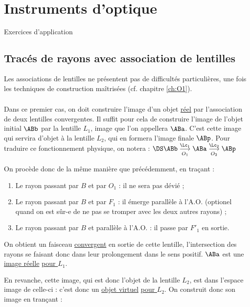 \documentclass[../main/main.tex]{subfiles}
\begin{document}
\chapter{Instruments d'optique}
\begin{center}
    \Huge Exercices d'application
\end{center}
\section{Tracés de rayons avec association de lentilles}
Les associations de lentilles ne présentent pas de difficultés particulières,
une fois les techniques de construction maîtrisées (cf. chapitre \ref{ch:O1}).

\subsection{}
Dans ce premier cas, on doit construire l'image d'un objet \underline{réel} par
l'association de deux lentilles convergentes. Il suffit pour cela de construire
l'image de l'objet initial $\ABb$ par la lentille $L_1$, image que l'on appellera
$\ABa$. C'est cette image qui servira d'objet à la lentille $L_2$, qui en
formera l'image finale $\ABp$. Pour traduire ce fonctionnement physique, on
notera : $\DS \ABb \underset{O_1}{\overset{\Lc_1}{\longrightarrow}} \ABa
\underset{O_2}{\overset{\Lc_2}{\longrightarrow}}\ABp$ \bigbreak

On procède donc de la même manière que précédemment, en traçant :
\begin{enumerate}
    \item Le rayon passant par $B$ et par $O_1$ : il ne sera pas dévié ;
    \item Le rayon passant par $B$ et par $F_1$ : il émerge parallèle à
        l'A.O. (optionel quand on est sûr-e de ne pas se
        tromper avec les deux autres rayons) ;
    \item Le rayon passant par $B$ et parallèle à l'A.O. : il passe par $F'_1$
        en sortie.
\end{enumerate}

On obtient un faisceau \underline{convergent} en sortie de cette lentille,
l'intersection des rayons se faisant donc dans leur prolongement dans le sens
positif. $\ABa$ est une \underline{image réelle} \underline{\underline{pour
$L_1$}}. \bigbreak

En revanche, cette image, qui est donc l'objet de la lentille $L_2$, est dans
l'espace image de celle-ci : c'est donc un \underline{objet virtuel}
\underline{\underline{pour $L_2$}}. On construit donc son image en trançant :
\end{document}
